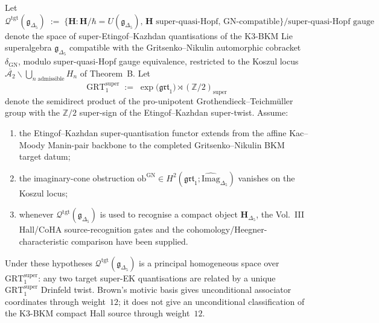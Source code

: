 \begin{theorem}
\label{thm:nc-grt1-super-torsor-delta5}
\ClaimStatusConditional
Let
\[
\mathcal Q^{\mathrm{tgt}}(\mathfrak g_{\Delta_5})
\;:=\;
\bigl\{\mathbf H : \mathbf H/\hbar = U(\mathfrak g_{\Delta_5}),
\,\mathbf H \text{ super-quasi-Hopf},
\,\mathrm{GN}\text{-compatible}\bigr\}\big/
\text{super-quasi-Hopf gauge}
\]
denote the space of super-Etingof--Kazhdan quantisations of the
K$3$-BKM Lie superalgebra $\mathfrak g_{\Delta_5}$ compatible with
the Gritsenko--Nikulin automorphic cobracket $\delta_{\mathrm{GN}}$,
modulo super-quasi-Hopf gauge equivalence, restricted to the Koszul
locus
$\overline{\mathcal A_2}\smallsetminus\bigcup_{n\;\text{admissible}}H_n$
of Theorem~B. Let
\[
\mathrm{GRT}_1^{\mathrm{super}}
\;:=\;
\exp\bigl(\widehat{\mathfrak{grt}}_1\bigr)\rtimes(\mathbb Z/2)_{\mathrm{super}}
\]
denote the semidirect product of the pro-unipotent Grothendieck--Teichm\"uller
group with the $\mathbb Z/2$ super-sign of the Etingof--Kazhdan
super-twist. Assume:
\begin{enumerate}
\item the Etingof--Kazhdan super-quantisation functor extends from the
affine Kac--Moody Manin-pair backbone to the completed
Gritsenko--Nikulin BKM target datum;
\item the imaginary-cone obstruction
$\mathrm{ob}^{\mathrm{GN}}\in
H^2(\mathfrak{grt}_1;\widehat{\mathrm{Imag}}_{\Delta_5})$ vanishes on
the Koszul locus;
\item whenever $\mathcal Q^{\mathrm{tgt}}(\mathfrak g_{\Delta_5})$ is
used to recognise a compact object $\mathbf H_{\Delta_5}$, the
Vol.~III Hall/CoHA source-recognition gates and the
cohomology/Heegner-characteristic comparison have been supplied.
\end{enumerate}
Under these hypotheses
$\mathcal Q^{\mathrm{tgt}}(\mathfrak g_{\Delta_5})$ is a principal
homogeneous space over $\mathrm{GRT}_1^{\mathrm{super}}$: any two
target super-EK quantisations are related by a unique
$\mathrm{GRT}_1^{\mathrm{super}}$ Drinfeld twist. Brown's motivic
basis gives unconditional associator coordinates through weight~$12$;
it does not give an unconditional classification of the K$3$-BKM
compact Hall source through weight~$12$.
\end{theorem}

